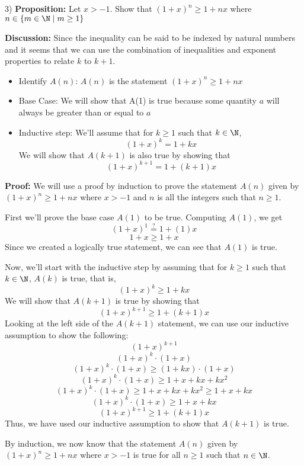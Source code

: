     \bigskip

    \begin{paragraph}{3)}
        \textbf{Proposition:} Let $x > -1$. Show that $(1 + x)^n \geq 1 + nx$ where $n \in \{m \in \N \mid m \geq 1\}$
        \spacing
        
        \textbf{Discussion:} Since the inequality can be said to be indexed by natural numbers and it seems that we can use the combination of inequalities and exponent properties to relate $k$ to $k + 1$.
        
        \begin{itemize}
            \item {
            Identify $A(n)$: $A(n)$ is the statement $(1 + x)^n \geq 1 + nx$
            }
            
            \item{
            Base Case: We will show that A(1) is true because some quantity $a$ will always be greater than or equal to $a$
            }
            
            \item{
            Inductive step: We'll assume that for $k \geq 1$ such that $k \in \N$,
            $$(1 + x)^k = 1 + kx$$
            We will show that $A(k + 1)$ is also true by showing that 
            $$(1 + x)^{k + 1} = 1 + (k + 1)x$$
            }
        \end{itemize}
        \spacing
        
        \textbf{Proof:} We will use a proof by induction to prove the statement $A(n)$ given by 
        $(1 + x)^n \geq 1 + nx$ where $x > -1$ and $n$ is all the integers such that $n \geq 1$.
        \spacing

        First we'll prove the base case $A(1)$ to be true. Computing $A(1)$, we get
        $$(1 + x) ^ 1 \stackrel{?}{=} 1 + (1)x$$
        $$1 + x \geq 1 + x$$
        Since we created a logically true statement, we can see that $A(1)$ is true.
        \spacing

        Now, we'll start with the inductive step by assuming that for $k \geq 1$ such that $k \in \N$, $A(k)$ is true, that is,
        $$(1 + x)^k \geq 1 + kx$$
        We will show that $A(k +1)$ is true by showing that 
        $$(1 + x)^{k +1} \geq 1 + (k +1)x$$
        Looking at the left side of the $A(k + 1)$ statement, we can use our inductive assumption to show the following:
        $$(1 + x)^{k + 1}$$
        $$(1 + x)^k \cdot (1 + x)$$
        $$(1 + x)^k \cdot (1 + x) \geq (1 + kx) \cdot (1 + x)$$
        $$(1 + x)^k \cdot (1 + x) \geq 1 + x + kx + kx^2$$
        $$(1 + x)^k \cdot (1 + x) \geq 1 + x + kx + kx^2 \geq 1 + x + kx$$
        $$(1 + x)^k \cdot (1 + x) \geq 1 + x + kx$$
        $$(1 + x)^{k + 1} \geq 1 + (k + 1)x$$
        Thus, we have used our inductive assumption to show that $A(k + 1)$ is true.
        \spacing
        
        By induction, we now know that the statement $A(n)$ given by $(1 + x)^n \geq 1 + nx$ where 
        $x > -1$ is true for all $n \geq 1$ such that $n \in \N$.\\
        \proofEnd
    \end{paragraph}

